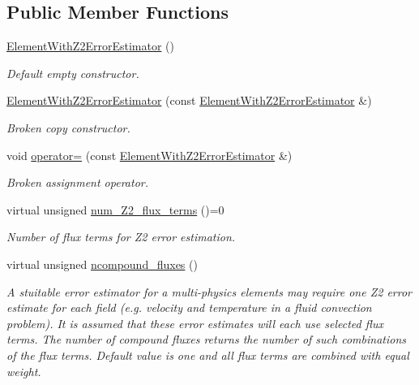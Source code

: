 \subsection*{Public Member Functions}
\begin{DoxyCompactItemize}
\item 
\hyperlink{classoomph_1_1ElementWithZ2ErrorEstimator_a53cec50800c0bdcd18bfc7b611d23d22}{Element\+With\+Z2\+Error\+Estimator} ()
\begin{DoxyCompactList}\small\item\em Default empty constructor. \end{DoxyCompactList}\item 
\hyperlink{classoomph_1_1ElementWithZ2ErrorEstimator_a214aebbd4b41b82b12f494eb0b581ef7}{Element\+With\+Z2\+Error\+Estimator} (const \hyperlink{classoomph_1_1ElementWithZ2ErrorEstimator}{Element\+With\+Z2\+Error\+Estimator} \&)
\begin{DoxyCompactList}\small\item\em Broken copy constructor. \end{DoxyCompactList}\item 
void \hyperlink{classoomph_1_1ElementWithZ2ErrorEstimator_a6b0711d7563ded7a7559a2ebe3c62cf6}{operator=} (const \hyperlink{classoomph_1_1ElementWithZ2ErrorEstimator}{Element\+With\+Z2\+Error\+Estimator} \&)
\begin{DoxyCompactList}\small\item\em Broken assignment operator. \end{DoxyCompactList}\item 
virtual unsigned \hyperlink{classoomph_1_1ElementWithZ2ErrorEstimator_ae82c5728902e13da31be19c390fc28e3}{num\+\_\+\+Z2\+\_\+flux\+\_\+terms} ()=0
\begin{DoxyCompactList}\small\item\em Number of \textquotesingle{}flux\textquotesingle{} terms for Z2 error estimation. \end{DoxyCompactList}\item 
virtual unsigned \hyperlink{classoomph_1_1ElementWithZ2ErrorEstimator_a1c0e819954397f99f8d03a15fecb2e6d}{ncompound\+\_\+fluxes} ()
\begin{DoxyCompactList}\small\item\em A stuitable error estimator for a multi-\/physics elements may require one Z2 error estimate for each field (e.\+g. velocity and temperature in a fluid convection problem). It is assumed that these error estimates will each use selected flux terms. The number of compound fluxes returns the number of such combinations of the flux terms. Default value is one and all flux terms are combined with equal weight. \end{DoxyCompactList}\item 

\end{DoxyCompactItemize}
